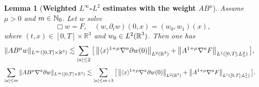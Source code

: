 \documentclass[11pt,twoside]{article}
\def\N{\mathop{\mathbb N\kern 0pt}\nolimits}
\def\R{\mathop{\mathbb R\kern 0pt}\nolimits}
\def\p{\partial}
\theoremstyle{plain}
\newtheorem{lemma}[theorem]{Lemma}
\theoremstyle{definition}
\theoremstyle{assumption}
\numberwithin{equation}{section}
\begin{document}
		\begin{lemma}[{\bf Weighted $L^\infty$-$L^2$ estimates with the weight $A B^\mu$}]\label{lem:weighted-Linfty-L2}
		Assume $\mu>0$ and $m\in\N_0$. Let $w$ solve
		\begin{equation*}
			\Box w=F,\quad
			(w,\partial_t w)(0,x)=(w_0,w_1)(x),
		\end{equation*}
		where $(t,x)\in [0,T]\times\mathbb R^3$ and $w_0\in L^2(\R^3)$.
		Then one has
		\begin{equation}\label{eq:weighted-Linfty-L2-w}
				\begin{aligned}
					\|A B^\mu w\|_{L^\infty([0,T]\times\mathbb R^3)}
					&\lesssim
					\sum_{|a|\le 2}
					\big[
					\left\|
					\langle x\rangle^{1+\mu}
					\nabla^a \p w(0)
					\right\|_{L^2(\R^3)}
					+
					\left\|
					A^{1+\mu}\nabla^a F
					\right\|_{L^1([0,T];L^2_x)}
					\big],
				\end{aligned}
		\end{equation}
		\begin{equation}\label{eq:weighted-Linfty-L2-dw}
			\begin{aligned}
				\sum_{|a|\le m}
				\|A B^\mu \nabla^a\partial w\|_{L^\infty([0,T]\times\mathbb R^3)}
				&\lesssim
				\sum_{|a|\le m+3}
				\big[
				\left\|
				\langle x\rangle^{1+\mu}
				\nabla^a \p w(0)
				\right\|_{L^2(\R^3)}
				+
				\left\|
				A^{1+\mu}\nabla^a F
				\right\|_{L^1([0,T];L^2_x)}
				\big].
			\end{aligned}
		\end{equation}
	\end{lemma}
	
\end{document}
